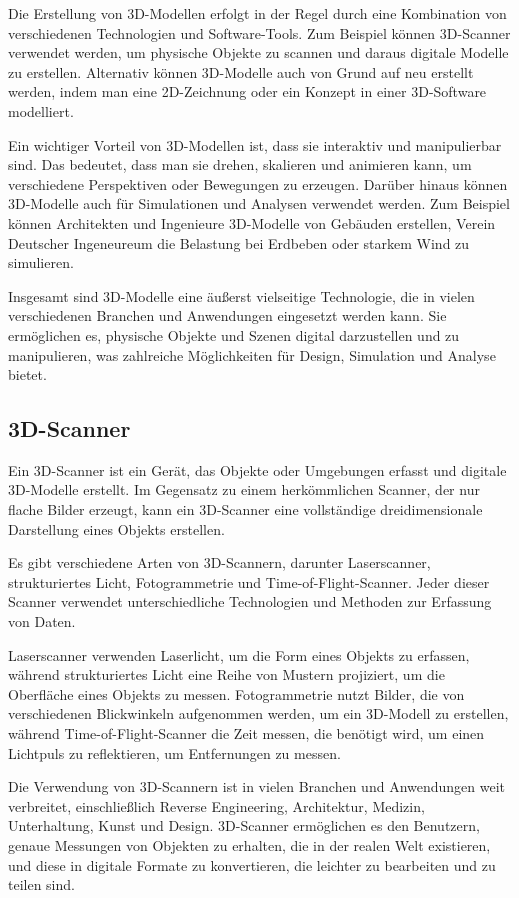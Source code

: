 Die Erstellung von 3D-Modellen erfolgt in der Regel durch eine Kombination von verschiedenen Technologien und Software-Tools. Zum Beispiel können 3D-Scanner verwendet werden, um physische Objekte zu scannen und daraus digitale Modelle zu erstellen. Alternativ können 3D-Modelle auch von Grund auf neu erstellt werden, indem man eine 2D-Zeichnung oder ein Konzept in einer 3D-Software modelliert.

Ein wichtiger Vorteil von 3D-Modellen ist, dass sie interaktiv und manipulierbar sind. Das bedeutet, dass man sie drehen, skalieren und animieren kann, um verschiedene Perspektiven oder Bewegungen zu erzeugen. Darüber hinaus können 3D-Modelle auch für Simulationen und Analysen verwendet werden. Zum Beispiel können Architekten und Ingenieure 3D-Modelle von Gebäuden erstellen, Verein Deutscher Ingeneureum die Belastung bei Erdbeben oder starkem Wind zu simulieren.

Insgesamt sind 3D-Modelle eine äußerst vielseitige Technologie, die in vielen verschiedenen Branchen und Anwendungen eingesetzt werden kann. Sie ermöglichen es, physische Objekte und Szenen digital darzustellen und zu manipulieren, was zahlreiche Möglichkeiten für Design, Simulation und Analyse bietet.

\subsection{3D-Scanner}
Ein 3D-Scanner ist ein Gerät, das Objekte oder Umgebungen erfasst und digitale 3D-Modelle erstellt. Im Gegensatz zu einem herkömmlichen Scanner, der nur flache Bilder erzeugt, kann ein 3D-Scanner eine vollständige dreidimensionale Darstellung eines Objekts erstellen.

Es gibt verschiedene Arten von 3D-Scannern, darunter Laserscanner, strukturiertes Licht, Fotogrammetrie und Time-of-Flight-Scanner. Jeder dieser Scanner verwendet unterschiedliche Technologien und Methoden zur Erfassung von Daten.

Laserscanner verwenden Laserlicht, um die Form eines Objekts zu erfassen, während strukturiertes Licht eine Reihe von Mustern projiziert, um die Oberfläche eines Objekts zu messen. Fotogrammetrie nutzt Bilder, die von verschiedenen Blickwinkeln aufgenommen werden, um ein 3D-Modell zu erstellen, während Time-of-Flight-Scanner die Zeit messen, die benötigt wird, um einen Lichtpuls zu reflektieren, um Entfernungen zu messen.

Die Verwendung von 3D-Scannern ist in vielen Branchen und Anwendungen weit verbreitet, einschließlich Reverse Engineering, Architektur, Medizin, Unterhaltung, Kunst und Design. 3D-Scanner ermöglichen es den Benutzern, genaue Messungen von Objekten zu erhalten, die in der realen Welt existieren, und diese in digitale Formate zu konvertieren, die leichter zu bearbeiten und zu teilen sind.


